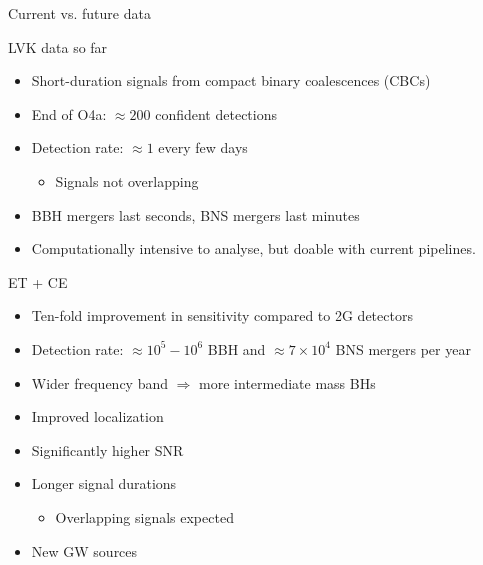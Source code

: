 \documentclass[aspectratio=169, 11pt]{beamer}
\def \bblock{\begin{beamerboxesrounded}[upper=uppercolor,lower=lowercolor,shadow=true]}
\def \eblock{\end{beamerboxesrounded}}
\begin{document}
\begin{frame}{Current vs. future data}
 \begin{minipage}{0.47\textwidth} \vspace{0.5cm}
 \bblock{\centering LVK data so far}
\begin{itemize} 
\item Short-duration signals from compact binary coalescences (CBCs)
\item End of O4a: $\approx 200$ confident detections 
\item Detection rate: $\approx 1$ every few days 
    \begin{itemize}
        \item Signals not overlapping
    \end{itemize}
\item BBH mergers last seconds, BNS mergers last minutes
\item Computationally intensive to analyse, but doable with current pipelines.
\end{itemize} 
\eblock
\end{minipage}\hfill                                        \begin{minipage}{0.47\textwidth}\vspace{0.6cm}                        \centering                                          
    \bblock{\centering ET + CE}
    \begin{itemize}
        \item Ten-fold improvement in sensitivity compared to 2G detectors
        \item Detection rate: $\approx 10^5-10^6$ BBH and $\approx 7 \times 10^4$ BNS mergers per year
        \item Wider frequency band $\Rightarrow$ more intermediate mass BHs
        \item Improved localization
        \item Significantly higher SNR
        \item Longer signal durations %
        \begin{itemize}
            \item Overlapping signals expected
        \end{itemize}
        \item New GW sources
    \end{itemize}
    \eblock
\end{minipage}                                                    
\end{frame}
\end{document}
